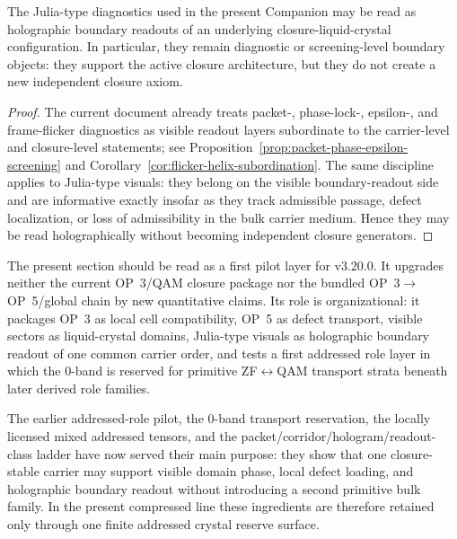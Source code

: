 \begin{proposition}
\label{prop:holographic-julia-boundary-principle}
The Julia-type diagnostics used in the present Companion may be read as holographic boundary readouts of an underlying closure-liquid-crystal configuration. In particular, they remain diagnostic or screening-level boundary objects: they support the active closure architecture, but they do not create a new independent closure axiom.
\end{proposition}

\begin{proof}
The current document already treats packet-, phase-lock-, epsilon-, and frame-flicker diagnostics as visible readout layers subordinate to the carrier-level and closure-level statements; see Proposition~\ref{prop:packet-phase-epsilon-screening} and Corollary~\ref{cor:flicker-helix-subordination}. The same discipline applies to Julia-type visuals: they belong on the visible boundary-readout side and are informative exactly insofar as they track admissible passage, defect localization, or loss of admissibility in the bulk carrier medium. Hence they may be read holographically without becoming independent closure generators.
\end{proof}

\begin{remark}
\label{rem:v320-pilot-status}
The present section should be read as a first pilot layer for v3.20.0. It upgrades neither the current OP~3/QAM closure package nor the bundled OP~3$\to$OP~5/global chain by new quantitative claims. Its role is organizational: it packages OP~3 as local cell compatibility, OP~5 as defect transport, visible sectors as liquid-crystal domains, Julia-type visuals as holographic boundary readout of one common carrier order, and tests a first addressed role layer in which the 0-band is reserved for primitive ZF$\leftrightarrow$QAM transport strata beneath later derived role families.
\end{remark}


\begin{remark}
\label{rem:status-of-the-compressed-addressed-crystal-reserve-surface}
The earlier addressed-role pilot, the 0-band transport reservation, the locally licensed mixed addressed tensors, and the packet/corridor/hologram/readout-class ladder have now served their main purpose: they show that one closure-stable carrier may support visible domain phase, local defect loading, and holographic boundary readout without introducing a second primitive bulk family. In the present compressed line these ingredients are therefore retained only through one finite addressed crystal reserve surface.
\end{remark}

